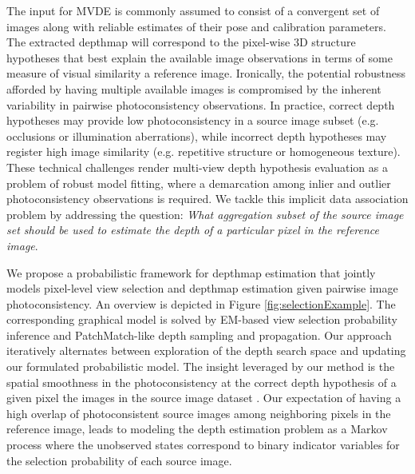 The input for MVDE is commonly assumed to consist of a convergent set of images along with reliable estimates of their pose and calibration parameters. The extracted depthmap will correspond to the pixel-wise 3D structure hypotheses that best explain the available image observations in terms of some measure of visual similarity \wrt  a reference image.
Ironically, the potential robustness afforded by having multiple available images is compromised by the inherent variability in pairwise photoconsistency observations. In practice, correct depth hypotheses may provide low photoconsistency in a source image subset (e.g. occlusions or  illumination aberrations), while incorrect depth hypotheses may register high image similarity (e.g. repetitive structure or homogeneous texture). These technical challenges render multi-view depth hypothesis evaluation as a problem of robust model fitting, where a demarcation among inlier and outlier photoconsistency observations is required.
We tackle this implicit data association problem by addressing the question: {\em What aggregation subset of the source image set should be used to estimate the depth of a particular pixel in the reference image}.

We propose a probabilistic framework  for depthmap estimation that jointly models pixel-level view selection and depthmap estimation given pairwise image photoconsistency. An overview is depicted in Figure \ref{fig:selectionExample}. The corresponding graphical model is solved by EM-based view selection probability inference and PatchMatch-like depth sampling and propagation. Our approach iteratively alternates between exploration of  the depth search space and updating our formulated probabilistic model. The insight leveraged by our method is the spatial smoothness in the photoconsistency at the correct depth hypothesis of a given pixel \wrt the images in the source image dataset \cite{CombinedDepthOutlier,Goesele07}.
Our expectation of  having a high overlap of photoconsistent source images among neighboring pixels in the reference image, leads to modeling  the depth estimation problem as a Markov process where the unobserved states correspond to binary indicator variables for the selection probability of each source image.

